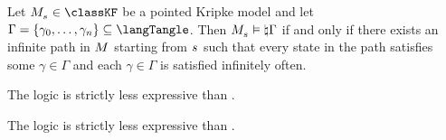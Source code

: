 
\begin{lemma}
Let $\kPModel{\kStateS} \in \classKF$ be a pointed Kripke model and let $\Gamma = \{\gamma_0, \dots, \gamma_n\} \subseteq \langTangle$.
Then $\kPModel{\kStateS} \entails \tangle \Gamma$ if and only if there exists an infinite path in $\kModel$ starting from $\kStateS$ such that every state in the path satisfies some $\gamma \in \Gamma$ and each $\gamma \in \Gamma$ is satisfied infinitely often.
\end{lemma}


\begin{theorem}
The logic \logicRmlKF{} is strictly less expressive than \logicTangleKF{}.
\end{theorem}


\begin{corollary}
The logic \logicRmlKF{} is strictly less expressive than \logicMuKF{}.
\end{corollary}

